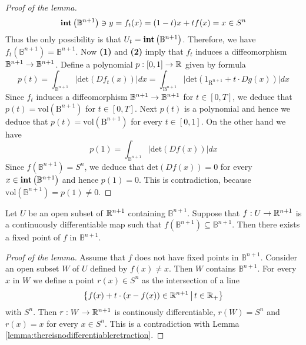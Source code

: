 \begin{proof}[Proof of the lemma]
$$\mathbf{int}\left(\mathbb{B}^{n+1}\right) \ni y = f_t(x) = (1-t)x + tf(x) = x \in S^n$$
Thus the only possibility is that $U_t = \mathbf{int}\left(\mathbb{B}^{n+1}\right)$. Therefore, we have $f_t(\mathbb{B}^{n+1}) = \mathbb{B}^{n+1}$. Now \textbf{(1)} and \textbf{(2)} imply that $f_t$ induces a diffeomorphism $\mathbb{B}^{n+1}\rightarrow \mathbb{B}^{n+1}$. Define a polynomial $p:[0,1]\rightarrow {\mathbb R}$ given by formula
$$p(t) = \int_{\mathbb{B}^{n+1}}\big|\mathrm{det}\left(Df_t(x)\right)\big|dx = \int_{\mathrm{B}^{n+1}}\big|\mathrm{det}\left(1_{\mathrm{R}^{n+1}} + t\cdot Dg(x)\right)\big|dx$$
Since $f_t$ induces a diffeomorphism $\mathbb{B}^{n+1}\rightarrow \mathbb{B}^{n+1}$ for $t\in [0,T]$, we deduce that $p(t) = \mathrm{vol}\left(\mathrm{B}^{n+1}\right)$ for $t\in [0,T]$. Next $p(t)$ is a polynomial and hence we deduce that $p(t) = \mathrm{vol}\left(\mathrm{B}^{n+1}\right)$ for every $t\in [0,1]$. On the other hand we have
$$p(1) = \int_{\mathbb{B}^{n+1}}\big|\mathrm{det}\left(Df(x)\right)\big|dx$$
Since $f(\mathbb{B}^{n+1}) = S^n$, we deduce that $\mathrm{det}\left(Df(x)\right)=0$ for every $x\in \mathbf{int}\left(\mathbb{B}^{n+1}\right)$ and hence $p(1) = 0$. This is contradiction, because $\mathrm{vol}\left(\mathbb{B}^{n+1}\right) = p(1) \neq 0$.
\end{proof}

\begin{lemma}\label{lemma:everycontinuouslydifferentiableadmitsafixedpoint}
Let $U$ be an open subset of ${\mathbb R}^{n+1}$ containing $\mathbb{B}^{n+1}$. Suppose that $f:U\rightarrow {\mathbb R}^{n+1}$ is a continuously differentiable map such that $f(\mathbb{B}^{n+1})\subseteq \mathbb{B}^{n+1}$. Then there exists a fixed point of $f$ in $\mathbb{B}^{n+1}$.
\end{lemma}
\begin{proof}[Proof of the lemma]
Assume that $f$ does not have fixed points in $\mathbb{B}^{n+1}$. Consider an open subset $W$ of $U$ defined by $f(x) \neq x$. Then $W$ contains $\mathbb{B}^{n+1}$. For every $x$ in $W$ we define a point $r(x)\in S^n$ as the intersection of a line
$$\big\{f(x) + t\cdot \left(x - f(x)\right)\in {\mathbb R}^{n+1}\,\big|\,t\in {\mathbb R}_+\big\}$$
with $S^n$. Then $r:W\rightarrow {\mathbb R}^{n+1}$ is continously differentiable, $r(W) = S^n$ and $r(x) = x$ for every $x\in S^n$. This is a contradiction with Lemma \ref{lemma:thereisnodifferentiableretraction}.
\end{proof}

